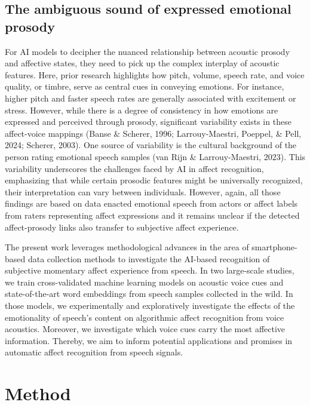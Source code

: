 \documentclass[
  english,
  man,floatsintext]{apa6}
\begin{document}
\hypertarget{the-ambiguous-sound-of-expressed-emotional-prosody}{%
\subsection{The ambiguous sound of expressed emotional prosody}\label{the-ambiguous-sound-of-expressed-emotional-prosody}}

For AI models to decipher the nuanced relationship between acoustic prosody and affective states, they need to pick up the complex interplay of acoustic features. Here, prior research highlights how pitch, volume, speech rate, and voice quality, or timbre, serve as central cues in conveying emotions. For instance, higher pitch and faster speech rates are generally associated with excitement or stress. However, while there is a degree of consistency in how emotions are expressed and perceived through prosody, significant variability exists in these affect-voice mappings (Banse \& Scherer, 1996; Larrouy-Maestri, Poeppel, \& Pell, 2024; Scherer, 2003). One source of variability is the cultural background of the person rating emotional speech samples (van Rijn \& Larrouy-Maestri, 2023). This variability underscores the challenges faced by AI in affect recognition, emphasizing that while certain prosodic features might be universally recognized, their interpretation can vary between individuals. However, again, all those findings are based on data enacted emotional speech from actors or affect labels from raters representing affect expressions and it remains unclear if the detected affect-prosody links also transfer to subjective affect experience.

The present work leverages methodological advances in the area of smartphone-based data collection methods to investigate the AI-based recognition of subjective momentary affect experience from speech. In two large-scale studies, we train cross-validated machine learning models on acoustic voice cues and state-of-the-art word embeddings from speech samples collected in the wild. In those models, we experimentally and exploratively investigate the effects of the emotionality of speech's content on algorithmic affect recognition from voice acoustics. Moreover, we investigate which voice cues carry the most affective information. Thereby, we aim to inform potential applications and promises in automatic affect recognition from speech signals.

\newpage

\hypertarget{method}{%
\section{Method}\label{method}}
\end{document}
